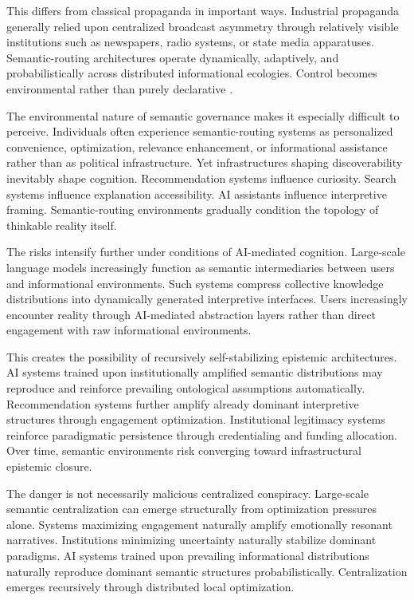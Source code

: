 \documentclass[11pt,a4paper]{article}
\begin{document}
This differs from classical propaganda in important ways. Industrial propaganda generally relied upon centralized broadcast asymmetry through relatively visible institutions such as newspapers, radio systems, or state media apparatuses. Semantic-routing architectures operate dynamically, adaptively, and probabilistically across distributed informational ecologies. Control becomes environmental rather than purely declarative \cite{foucault1977}.

The environmental nature of semantic governance makes it especially difficult to perceive. Individuals often experience semantic-routing systems as personalized convenience, optimization, relevance enhancement, or informational assistance rather than as political infrastructure. Yet infrastructures shaping discoverability inevitably shape cognition. Recommendation systems influence curiosity. Search systems influence explanation accessibility. AI assistants influence interpretive framing. Semantic-routing environments gradually condition the topology of thinkable reality itself.

The risks intensify further under conditions of AI-mediated cognition. Large-scale language models increasingly function as semantic intermediaries between users and informational environments. Such systems compress collective knowledge distributions into dynamically generated interpretive interfaces. Users increasingly encounter reality through AI-mediated abstraction layers rather than direct engagement with raw informational environments.

This creates the possibility of recursively self-stabilizing epistemic architectures. AI systems trained upon institutionally amplified semantic distributions may reproduce and reinforce prevailing ontological assumptions automatically. Recommendation systems further amplify already dominant interpretive structures through engagement optimization. Institutional legitimacy systems reinforce paradigmatic persistence through credentialing and funding allocation. Over time, semantic environments risk converging toward infrastructural epistemic closure.

The danger is not necessarily malicious centralized conspiracy. Large-scale semantic centralization can emerge structurally from optimization pressures alone. Systems maximizing engagement naturally amplify emotionally resonant narratives. Institutions minimizing uncertainty naturally stabilize dominant paradigms. AI systems trained upon prevailing informational distributions naturally reproduce dominant semantic structures probabilistically. Centralization emerges recursively through distributed local optimization.
\end{document}
